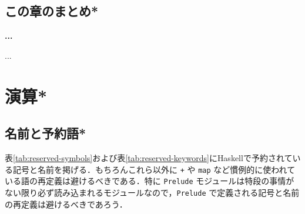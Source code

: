 \documentclass[a4paper,twocolumn]{jsbook}
\newcommand{\programminglanguage}[1]{\textsf{#1}}
\newcommand{\haskell}{\programminglanguage{Haskell}}
\newenvironment{note}[1]{\begin{boxnote}\begin{center}\textbf{#1}\end{center}}{\end{boxnote}}
\newcommand{\code}[1]{\texttt{#1}}
\begin{document}
\section{この章のまとめ*}

\begin{note}{...}
...
\end{note}

\chapter{演算*}
\section{名前と予約語*}
表\ref{tab:reserved-symbols}および表\ref{tab:reserved-keywords}に\haskell で予約されている記号と名前を掲げる．もちろんこれら以外に \code{+} や \code{map} など慣例的に使われている語の再定義は避けるべきである．特に \code{Prelude} モジュールは特段の事情がない限り必ず読み込まれるモジュールなので，\code{Prelude} で定義される記号と名前の再定義は避けるべきであろう．%
\end{document}
